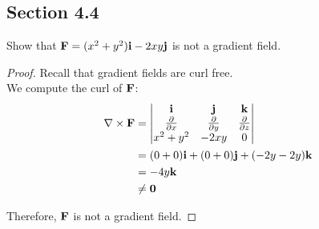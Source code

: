 \subsection{Section 4.4}

\begin{tcolorbox}[
        title={Problem 34 (a)},
        valign=center,
        nobeforeafter,
        colframe=gray!95!black
    ]
Show that \(\vb{F} = (x^2 + y^2)\vb{i} - 2xy\vb{j}\) is not a gradient field.
\end{tcolorbox}

\begin{proof}
    Recall that gradient fields are curl free. \\
    
    We compute the curl of \(\vb{F}\):
    \begin{align*}
        \nabla \times \vb{F} &= 
        \begin{vmatrix}
            \vb{i} & \vb{j} & \vb{k} \\
            \frac{\partial}{\partial x} & \frac{\partial}{\partial y} & \frac{\partial}{\partial z} \\
            x^2 + y^2 & -2xy & 0
        \end{vmatrix} \\
        &= (0 + 0)\vb{i} + (0 + 0)\vb{j} + (-2y - 2y)\vb{k} \\
        &= -4y \vb{k} \\
        &\neq \vb{0}
    \end{align*}
    
    Therefore, \(\vb{F}\) is not a gradient field.
\end{proof}